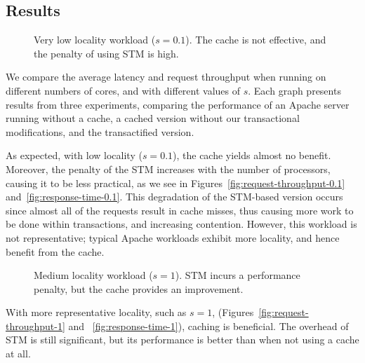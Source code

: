 \documentclass[11pt]{sigplanconf}
\begin{document}
\subsection{Results} 

\begin{figure}
 \centering
 \hfill
 \caption{Very low locality workload ($s = 0.1$). The cache is not effective,
 and the penalty of using STM is high.}
\end{figure}

We compare the average latency and request throughput when running on different
numbers of cores, and with different  values of $s$. Each graph presents 
results from three
experiments, comparing the performance of an Apache server running without a cache, a
cached version without our transactional modifications, and the transactified
version. 

As expected, with low locality ($s=0.1$), the cache yields almost no benefit.
Moreover, the penalty of
the STM increases with the number of processors, causing it to be less
practical, as we see in Figures~\ref{fig:request-throughput-0.1}
and~\ref{fig:response-time-0.1}. This degradation of the STM-based version
occurs since almost all of the requests result in cache
misses, thus causing more work to be done within transactions, 
and increasing contention.  However, this workload is not representative;
typical Apache workloads exhibit more locality, and hence benefit from
the cache.

\begin{figure}
 \centering
 \hfill
 \caption{Medium locality workload ($s = 1$). 
 STM incurs a performance penalty, but the cache provides an improvement.}
\end{figure}

With more representative locality, such as $s=1$,
(Figures~\ref{fig:request-throughput-1} and ~\ref{fig:response-time-1}), caching
is beneficial. The overhead of STM is still significant, but its performance is
better than when not using a cache at all. 
\end{document}
